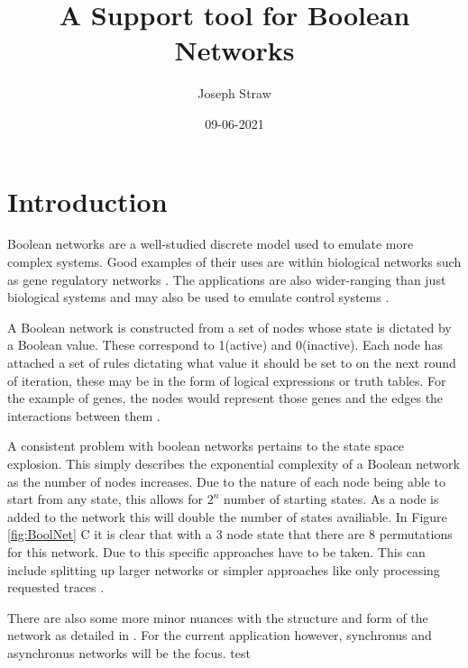 \documentclass[12pt, letterpaper]{article}
\title{A Support tool for Boolean Networks}
\date{09-06-2021}
\author{Joseph Straw}
\begin{document}
  \maketitle
  \newpage

  \section{Introduction}

    Boolean networks are a well-studied discrete model used to emulate more
    complex systems. Good examples of their uses are within biological
    networks such as gene regulatory networks \cite{SCHWAB2020571} \cite{TRAN2016107}. 
    The applications are also wider-ranging than just biological systems and may also
    be used to emulate control systems \cite{Valverde:2020we}.

    A Boolean network is constructed from a set of nodes whose state is 
    dictated by a Boolean value. These correspond to 1(active) and 0(inactive). 
    Each node has attached a set of rules dictating what value it should be set 
    to on the next round of iteration, these may be in the form of logical 
    expressions or truth tables. For the example of genes, the nodes would 
    represent those genes and the edges the interactions between them \cite{RISTEVSKI2015111}.

    A consistent problem with boolean networks pertains to the state space explosion.
    This simply describes the exponential complexity of a Boolean network as the 
    number of nodes increases. Due to the nature of each node being able to start from 
    any state, this allows for \(2^n\) number of starting states. As a node is added to 
    the network this will double the number of states availiable. In Figure \ref{fig:BoolNet} C
    it is clear that with a 3 node state that there are 8 permutations for this network. Due 
    to this specific approaches have to be taken. This can include splitting up larger networks 
    or simpler approaches like only processing requested traces \cite{RISTEVSKI2015111}.

    There are also some more minor nuances with the structure and form of the network as detailed in 
    \cite{10.3389/fphys.2018.00586}. For the current application however, synchronus and asynchronus networks
    will be the focus. test
    
\end{document}
